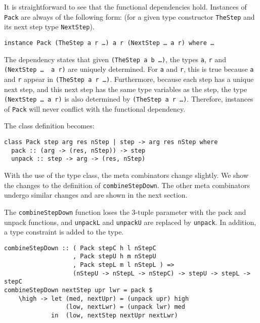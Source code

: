 It is straightforward to see that the functional dependencies hold. Instances of \texttt{Pack} are always of the following form: (for a given type constructor \texttt{TheStep} and its next step type \texttt{NextStep}).

{\tt instance Pack (TheStep a r \dots) a r (NextStep \dots~a r) where \dots}

 The dependency states that given \texttt{(TheStep a b \dots)}, the types \texttt{a}, \texttt{r} and \texttt{(NextStep \dots~ a r)} are uniquely determined. For \texttt{a} and \texttt{r}, this is true because \texttt{a} and \texttt{r} appear in \texttt{(TheStep a r \dots)}. Furthermore, because each step has a unique next step, and this next step has the same type variables as the step, the type \texttt{(NextStep \dots~a r)} is also determined by \texttt{(TheStep a r \dots)}. Therefore, instances of \texttt{Pack} will never conflict with the functional dependency.

 The class definition becomes:

\begin{small}
\begin{verbatim}
class Pack step arg res nStep | step -> arg res nStep where
  pack :: (arg -> (res, nStep)) -> step
  unpack :: step -> arg -> (res, nStep)
\end{verbatim}
\end{small}

With the use of the type class, the meta combinators change slightly. We show the changes to the definition of \texttt{combineStepDown}. The other meta combinators undergo similar changes and are shown in the next section.

The \texttt{combineStepDown} function loses the 3-tuple parameter with the pack and unpack functions, and \texttt{unpackL} and \texttt{unpackU} are replaced by \texttt{unpack}. In addition, a type constraint is added to the type.

\begin{small}
\begin{verbatim}
combineStepDown :: ( Pack stepC h l nStepC 
                   , Pack stepU h m nStepU
                   , Pack stepL m l nStepL ) => 
                   (nStepU -> nStepL -> nStepC) -> stepU -> stepL -> stepC
combineStepDown nextStep upr lwr = pack $
    \high -> let (med, nextUpr) = (unpack upr) high
                 (low, nextLwr) = (unpack lwr) med
             in  (low, nextStep nextUpr nextLwr)
\end{verbatim}
\end{small}

